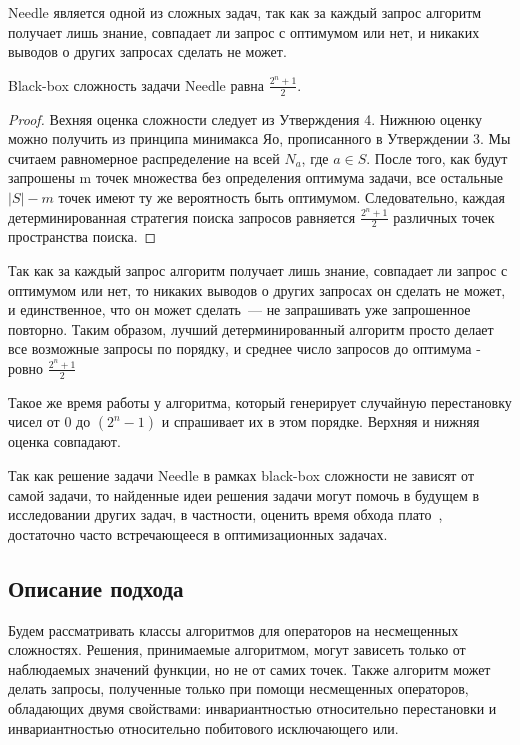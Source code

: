 Needle является одной из сложных задач, так как за каждый запрос алгоритм получает лишь знание, совпадает ли запрос с оптимумом или нет, и никаких выводов о других запросах сделать не может. 

\begin{myth}
Black-box сложность задачи Needle равна $\frac{2^n + 1}{2}$.
\end{myth}
\begin{proof}
    Вехняя оценка сложности следует из Утверждения 4. Нижнюю оценку можно получить из принципа минимакса Яо, прописанного в Утверждении 3.
    Мы считаем равномерное распределение на всей $N_a$, где $a \in S$. После того, как будут запрошены m точек множества без определения оптимума задачи, все остальные $|S| - m$
    точек имеют ту же вероятность быть оптимумом. Следовательно, каждая детерминированная стратегия поиска запросов равняется $\frac{2^n + 1}{2}$ различных точек пространства поиска.
\end{proof}

Так как за каждый запрос алгоритм получает лишь знание, совпадает ли запрос с оптимумом или нет, то никаких выводов о других запросах он сделать не может, и единственное, что он может сделать~--- не 
запрашивать уже запрошенное повторно. Таким образом, лучший детерминированный алгоритм просто делает все возможные запросы по порядку, и среднее число запросов до оптимума - ровно $\frac{2^n + 1}{2}$

Такое же время работы у алгоритма, который генерирует случайную перестановку чисел от 0 до $(2^n - 1)$ и спрашивает их в этом порядке. Верхняя и нижняя оценка совпадают.

Так как решение задачи Needle в рамках black-box сложности не зависят от самой задачи, то найденные идеи решения задачи могут помочь в будущем в исследовании других задач, в частности,
оценить время обхода плато~\cite{6}, достаточно часто встречающееся в оптимизационных задачах. 

\subsection{Описание подхода}

Будем рассматривать классы алгоритмов для операторов на несмещенных сложностях. Решения, принимаемые алгоритмом, могут зависеть только от наблюдаемых значений функции, но не от самих точек. 
Также алгоритм может делать запросы, полученные только при помощи несмещенных операторов, обладающих двумя свойствами: инвариантностью относительно перестановки и инвариантностью относительно 
побитового исключающего или. 
	
